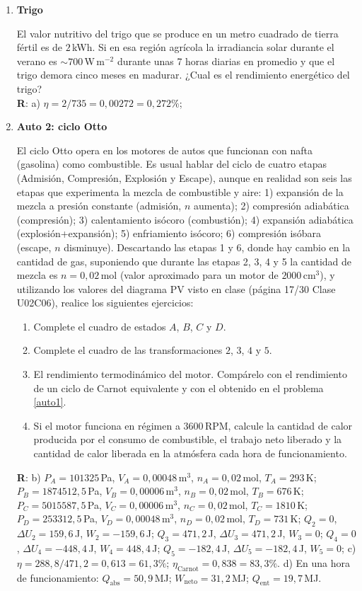 \documentclass[a4paper,12pt]{article}
\begin{document}
\begin{enumerate}
	\item {\bf{Trigo}}
		
		El valor nutritivo del trigo que se produce en un metro cuadrado de
		tierra fértil es de $2$\,kWh. Si en esa región agrícola la irradiancia solar
		durante el verano es $\sim 700$\,W\,m$^{-2}$ durante unas 7 horas
		diarias en promedio y que el trigo demora cinco meses en madurar.  
		¿Cual es el rendimiento energético del trigo? 
		\\{\bf{R}}: a) $\eta=2/735=0,00272 = 0,272\%$;

	\item {\bf{Auto 2: ciclo Otto}}
		
		El ciclo Otto opera en los motores de autos que funcionan con nafta
		(gasolina) como combustible. Es usual hablar del ciclo de cuatro etapas
		(Admisión, Compresión, Explosión y Escape), aunque en realidad son seis
		las etapas que experimenta la mezcla de combustible y aire: 1)
		expansión de la mezcla a presión constante (admisión, $n$ aumenta); 2)
		compresión adiabática (compresión); 3) calentamiento isócoro
		(combustión); 4) expansión adiabática (explosión+expansión); 5)
		enfriamiento isócoro; 6) compresión isóbara (escape, $n$ disminuye).
		Descartando las etapas 1 y 6, donde hay cambio en la cantidad de gas,
		suponiendo que durante las etapas 2, 3, 4 y 5 la cantidad de mezcla es
		$n=0,02$\,mol (valor aproximado para un motor de $2000$\,cm$^3$), y
		utilizando los valores del diagrama PV visto en clase (página 17/30
		Clase U02C06), realice los siguientes ejercicios:  
		\begin{enumerate}
			\item Complete el cuadro de estados $A$, $B$, $C$ y $D$. 
			\item Complete el cuadro de las transformaciones $2$, $3$, $4$ y
				$5$.  
			\item El rendimiento termodinámico del motor. Compárelo con el
				rendimiento de un ciclo de Carnot equivalente y con el obtenido
				en el problema \ref{auto1}.
			\item Si el motor funciona en régimen a $3600$\,RPM, calcule la
				cantidad de calor producida por el consumo de combustible, el
				trabajo neto liberado y la cantidad de calor liberada en la
				atmósfera cada hora de funcionamiento.		
		\end{enumerate}
		{\bf{R}}: 
		b)
		$P_A=101325$\,Pa, $V_A=0,00048$\,m$^3$, $n_A=0,02$\,mol, $T_A=293$\,K; 
		$P_B=1874512,5$\,Pa, $V_B=0,00006$\,m$^3$, $n_B=0,02$\,mol, $T_B=676$\,K; 
		$P_C=5015587,5$\,Pa, $V_C=0,00006$\,m$^3$, $n_C=0,02$\,mol, $T_C=1810$\,K; 
		$P_D=253312,5$\,Pa, $V_D=0,00048$\,m$^3$, $n_D=0,02$\,mol, $T_D=731$\,K;
		$Q_2=0$, $\Delta U_2=159,6$\,J, $W_2=-159,6$\,J;
		$Q_3=471,2$\,J, $\Delta U_3=471,2$\,J, $W_3=0$;
		$Q_4=0$, $\Delta U_4=-448,4$\,J, $W_4=448,4$\,J;
		$Q_5=-182,4$\,J, $\Delta U_5=-182,4$\,J, $W_5=0$;
		c)
		$\eta=288,8/471,2 = 0,613 = 61,3\%$; $\eta_{\mathrm{Carnot}} = 0,838 = 83,3\%$.
		d) En una hora de funcionamiento: $Q_{\mathrm{abs}}=50,9$\,MJ;
		$W_{\mathrm{neto}}=31,2$\,MJ; $Q_{\mathrm{ent}}=19,7$\,MJ.


\end{enumerate}
\end{document}
